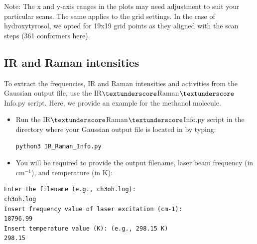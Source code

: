 \documentclass[12pt]{article}
\begin{document}
Note: The x and y-axis ranges in the plots may need adjustment to suit your particular scans. The same applies to the grid settings. In the case of hydroxytyrosol, we opted for 19x19 grid points as they aligned with the scan steps (361 conformers here).

\newpage
\subsection{IR and Raman intensities}

To extract the frequencies, IR and Raman intensities and activities from the Gaussian output file, use the IR$\textunderscore$Raman$\textunderscore$Info.py script. Here, we provide an example for the methanol molecule. 

\begin{itemize}
    \item Run the IR$\textunderscore$Raman$\textunderscore$Info.py script in the directory where your Gaussian output file is located in by typing:
\begin{lstlisting}[style=python]
python3 IR_Raman_Info.py
\end{lstlisting}
    \item You will be required to provide the output filename, laser beam frequency (in cm$^{-1}$), and temperature (in K):
\end{itemize}

\begin{lstlisting}[style=bash]
Enter the filename (e.g., ch3oh.log): 
ch3oh.log
Insert frequency value of laser excitation (cm-1):
18796.99
Insert temperature value (K): (e.g., 298.15 K)
298.15
\end{lstlisting}
\end{document}
